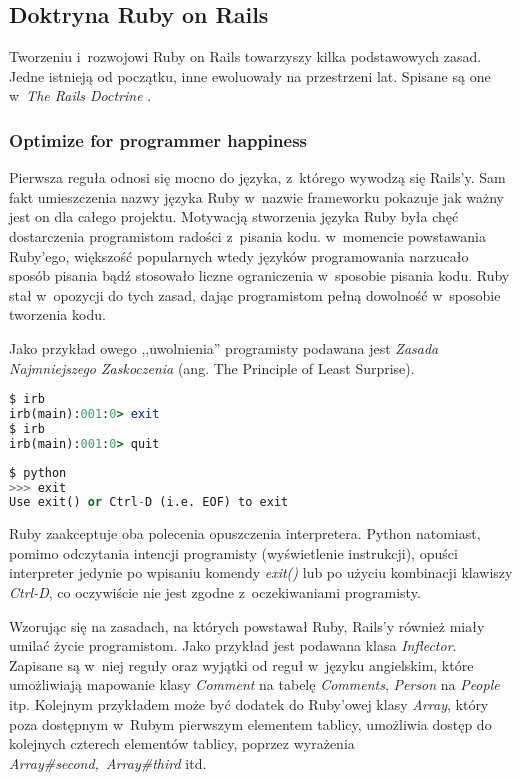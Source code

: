 \documentclass[mgr,oneside]{mgr}
\begin{document}
\subsection{Doktryna Ruby on Rails}
Tworzeniu i~rozwojowi Ruby on Rails towarzyszy kilka podstawowych zasad. Jedne istnieją od początku, inne ewoluowały na przestrzeni lat. Spisane są one w~\emph{The Rails Doctrine} \cite{rails_doctrine}.

\subsubsection{Optimize for programmer happiness}
Pierwsza reguła odnosi się mocno do języka, z~którego wywodzą się Rails'y. Sam fakt umieszczenia nazwy języka Ruby w~nazwie frameworku pokazuje jak ważny jest on dla całego projektu. Motywacją stworzenia języka Ruby była chęć dostarczenia programistom radości z~pisania kodu. w~momencie powstawania Ruby'ego, większość popularnych wtedy języków programowania narzucało sposób pisania bądź stosowało liczne ograniczenia w~sposobie pisania kodu. Ruby stał w~opozycji do tych zasad, dając programistom pełną dowolność w~sposobie tworzenia kodu.

Jako przykład owego ,,uwolnienia'' programisty podawana jest \emph{Zasada Najmniejszego Zaskoczenia} (ang. The Principle of Least Surprise).
\begin{lstlisting}[caption={Wyjście z~interpretera Ruby'ego.},language=Ruby]
$ irb
irb(main):001:0> exit
$ irb
irb(main):001:0> quit
\end{lstlisting}

\begin{lstlisting}[caption={Wyjście z~interpretera Python'a.},language=Python]
$ python
>>> exit
Use exit() or Ctrl-D (i.e. EOF) to exit
\end{lstlisting}
Ruby zaakceptuje oba polecenia opuszczenia interpretera. Python natomiast, pomimo odczytania intencji programisty (wyświetlenie instrukcji), opuści interpreter jedynie po wpisaniu komendy \emph{exit()} lub po użyciu kombinacji klawiszy \emph{Ctrl-D}, co oczywiście nie jest zgodne z~oczekiwaniami programisty.

Wzorując się na zasadach, na których powstawał Ruby, Rails'y również miały umilać życie programistom. Jako przykład jest podawana klasa \emph{Inflector}. Zapisane są w~niej reguły oraz wyjątki od reguł w~języku angielskim, które umożliwiają mapowanie klasy \emph{Comment} na tabelę \emph{Comments}, \emph{Person} na \emph{People} itp. Kolejnym przykładem może być dodatek do Ruby'owej klasy \emph{Array}, który poza dostępnym w~Rubym pierwszym elementem tablicy, umożliwia dostęp do kolejnych czterech elementów tablicy, poprzez wyrażenia \emph{Array\#second,~Array\#third} itd.
\end{document}
